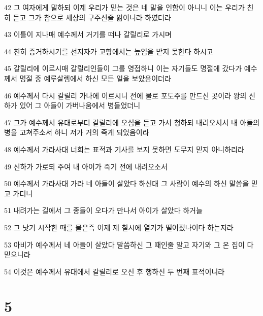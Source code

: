 \par 42 그 여자에게 말하되 이제 우리가 믿는 것은 네 말을 인함이 아니니 이는 우리가 친히 듣고 그가 참으로 세상의 구주신줄 앎이니라 하였더라
\par 43 이틀이 지나매 예수께서 거기를 떠나 갈릴리로 가시며
\par 44 친히 증거하시기를 선지자가 고향에서는 높임을 받지 못한다 하시고
\par 45 갈릴리에 이르시매 갈릴리인들이 그를 영접하니 이는 자기들도 명절에 갔다가 예수께서 명절 중 예루살렘에서 하신 모든 일을 보았음이더라
\par 46 예수께서 다시 갈릴리 가나에 이르시니 전에 물로 포도주를 만드신 곳이라 왕의 신하가 있어 그 아들이 가버나움에서 병들었더니
\par 47 그가 예수께서 유대로부터 갈릴리에 오심을 듣고 가서 청하되 내려오셔서 내 아들의 병을 고쳐주소서 하니 저가 거의 죽게 되었음이라
\par 48 예수께서 가라사대 너희는 표적과 기사를 보지 못하면 도무지 믿지 아니하리라
\par 49 신하가 가로되 주여 내 아이가 죽기 전에 내려오소서
\par 50 예수께서 가라사대 가라 네 아들이 살았다 하신대 그 사람이 예수의 하신 말씀을 믿고 가더니
\par 51 내려가는 길에서 그 종들이 오다가 만나서 아이가 살았다 하거늘
\par 52 그 낫기 시작한 때를 물은즉 어제 제 칠시에 열기가 떨어졌나이다 하는지라
\par 53 아비가 예수께서 네 아들이 살았다 말씀하신 그 때인줄 알고 자기와 그 온 집이 다 믿으니라
\par 54 이것은 예수께서 유대에서 갈릴리로 오신 후 행하신 두 번째 표적이니라

\chapter{5}

